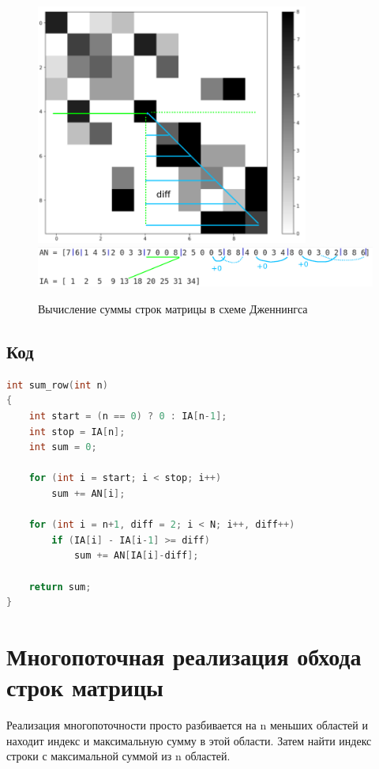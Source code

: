 \begin{figure}[h!]
    \centering
    \includegraphics[width=0.8\textwidth]{inc/p3.png}
    \includegraphics[width=1\textwidth]{inc/p4.png}
    \caption{Вычисление суммы строк матрицы в схеме Дженнингса}
    \label{fig:2.2}
\end{figure}


\pagebreak
\subsection*{Код}

\begin{lstlisting}[language=c++]
int sum_row(int n)
{
    int start = (n == 0) ? 0 : IA[n-1];
    int stop = IA[n];
    int sum = 0;

    for (int i = start; i < stop; i++)
        sum += AN[i];

    for (int i = n+1, diff = 2; i < N; i++, diff++)
        if (IA[i] - IA[i-1] >= diff)
            sum += AN[IA[i]-diff];

    return sum;
}
\end{lstlisting}


\section{Многопоточная реализация обхода строк матрицы}

Реализация многопоточности просто разбивается на n меньших областей и находит индекс и максимальную сумму в этой области. Затем найти индекс строки с максимальной суммой из n областей.


